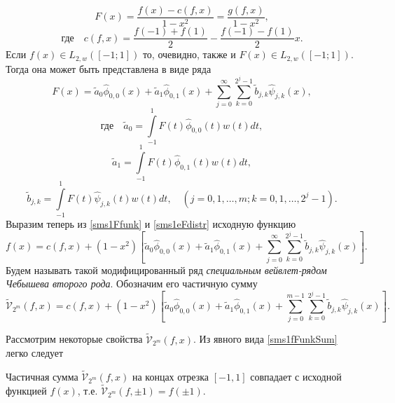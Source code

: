 \begin{equation}
\label{sms1Ffunk}
F(x) = \frac{f(x)-c(f,x)}{1-x^2} = \frac{g(f,x)}{1-x^2},
\end{equation}
\begin{equation*}
\label{sms1af}
\text{где}\quad c(f,x) = \frac{f(-1) + f(1)}{2} - \frac{f(-1) - f(1)}{2} x.
\end{equation*}
Если $f(x) \in L_{2, w}([-1; 1])$ то, очевидно, также и $F(x) \in L_{2, w}([-1; 1])$. Тогда она может быть представлена в виде ряда
\begin{equation}
\label{sms1eFdistr}
F(x) = \tilde{a}_{0}\hat{\phi}_{0,0}(x) + \tilde{a}_{1}\hat{\phi}_{0,1}(x) + \sum\limits_{j=0}^{\infty} \sum\limits_{k=0}^{2^j-1} \tilde{b}_{j,k}\hat{\psi}_{j,k}(x),
\end{equation}
\begin{equation*}
\label{sms1efcoeffA0}
\text{где}\quad \tilde{a}_{0} = \int\limits_{-1}^{1} F(t)\hat{\phi}_{0,0}(t) w(t)dt,
\end{equation*}
\begin{equation*}
\label{sms1efcoeffA1}
\tilde{a}_{1} = \int\limits_{-1}^{1} F(t)\hat{\phi}_{0,1}(t) w(t) dt,
\end{equation*}
\begin{equation*}
\label{sms1efcoeffB}
\tilde{b}_{j,k} = \int\limits_{-1}^{1} F(t)\hat{\psi}_{j,k}(t) w(t) dt, \quad (j=0,1, \ldots, m; k = 0, 1, \ldots, 2^j-1).
\end{equation*}
Выразим теперь из \eqref{sms1Ffunk} и \eqref{sms1eFdistr} исходную функцию
\begin{equation*}
\label{sms1fFunk}
f(x)=
c(f,x)+(1-x^2) \left[ \tilde{a}_{0}\hat{\phi}_{0,0}(x) + \tilde{a}_{1}\hat{\phi}_{0,1}(x) + \sum\limits_{j=0}^{\infty} \sum\limits_{k=0}^{2^j-1} \tilde{b}_{j,k}\hat{\psi}_{j,k}(x) \right].
\end{equation*}
Будем называть такой модифицированный ряд \textit{специальным вейвлет-рядом Чебышева второго рода}. Обозначим его частичную сумму
\begin{equation}
\label{sms1fFunkSum}
\tilde{\mathcal{V}}_{2^m}(f,x)  = c(f,x)+(1-x^2) \left[ \tilde{a}_{0}\hat{\phi}_{0,0}(x) + \tilde{a}_{1}\hat{\phi}_{0,1}(x) + \sum\limits_{j=0}^{m-1} \sum\limits_{k=0}^{2^j-1} \tilde{b}_{j,k}\hat{\psi}_{j,k}(x) \right].
\end{equation}

\noindent Рассмотрим некоторые свойства $\tilde{\mathcal{V}}_{2^m}(f,x)$. Из явного вида \eqref{sms1fFunkSum} легко следует

\begin{theorem} \label{sms_th1}
  Частичная сумма $\tilde{\mathcal{V}}_{2^m}(f,x)$ на концах отрезка $[-1,1]$ совпадает с исходной функцией $f(x)$, т.е. $\tilde{\mathcal{V}}_{2^m}(f,\pm1) = f(\pm1)$.
\end{theorem}

